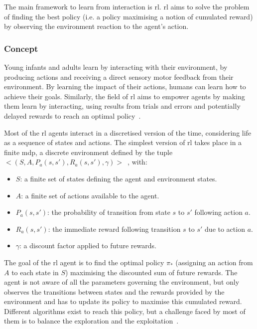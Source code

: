 The main framework to learn from interaction is \acrfull{rl}. \gls{rl} aims to solve the problem of finding the best policy (i.e. a policy maximising a notion of cumulated reward) by observing the environment reaction to the agent's action.

\subsubsection{Concept} 

Young infants and adults learn by interacting with their environment, by producing actions and receiving a direct sensory motor feedback from their environment. By learning the impact of their actions, humans can learn how to achieve their goals. Similarly, the field of \gls{rl} aims to empower agents by making them learn by interacting, using results from trials and errors and potentially delayed rewards to reach an optimal policy~\citep{sutton1998reinforcement}. 

Most of the \gls{rl} agents interact in a discretised version of the time, considering life as a sequence of states and actions. The simplest version of \gls{rl} takes place in a finite \gls{mdp}, a discrete environment defined by the tuple $<(S, A, P_a(s,s'), R_a(s,s'), \gamma)>$~\citep{howard1960dynamic}, with:
\begin{itemize}
	\item $S$: a finite set of states defining the agent and environment states.
	\item $A$: a finite set of actions available to the agent.
	\item $P_a(s,s')$: the probability of transition from state $s$ to $s'$ following action $a$.
	\item $R_a(s,s')$: the immediate reward following transition $s$ to $s'$ due to action $a$.
	\item $\gamma$: a discount factor applied to future rewards.
\end{itemize}

The goal of the \gls{rl} agent is to find the optimal policy $\pi_*$ (assigning an action from $A$ to each state in $S$) maximising the discounted sum of future rewards. The agent is not aware of all the parameters governing the environment, but only observes the transitions between states and the rewards provided by the environment and has to update its policy to maximise this cumulated reward. Different algorithms exist to reach this policy, but a challenge faced by most of them is to balance the exploration and the exploitation~\citep{sutton1998reinforcement}.

